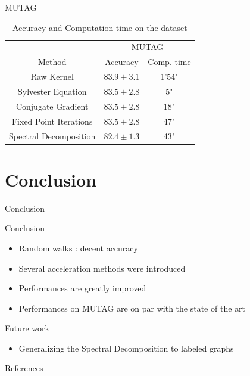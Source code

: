 \documentclass[compress]{beamer}
\begin{document}
\begin{frame}{MUTAG}
\begin{table}[!htb]
	\begin{center}
		\begin{tabular}{|c||c|c|}
			\hline
			& \multicolumn{2}{|c|}{MUTAG}\\
			\cline{2-3}
			Method & Accuracy & Comp. time\\
			\hline 
			Raw Kernel & $83.9\pm 3.1$ & 1'54"\\
			Sylvester Equation & $83.5\pm 2.8$ & 5"\\
			Conjugate Gradient & $83.5\pm 2.8$ & 18"\\
			Fixed Point Iterations & $83.5\pm 2.8$ & 47" \\
			Spectral Decomposition & $82.4\pm 1.3$ & 43"\\
			\hline
		\end{tabular}
	\end{center}
	\caption*{Accuracy and Computation time on the dataset}
\end{table}
\end{frame}


\section{Conclusion}
\begin{frame}{Conclusion}
\begin{block}{Conclusion}
	\begin{itemize}
		\item Random walks : decent accuracy
		\item Several acceleration methods were introduced
		\item Performances are greatly improved
		\item Performances on MUTAG are on par with the state of the art
	\end{itemize}
\end{block}
\begin{block}{Future work}
	\begin{itemize}
		\item Generalizing the Spectral Decomposition to labeled graphs
	\end{itemize}
\end{block}
\end{frame}

\renewcommand\bibsection{\subsection{\refname}}
\begin{frame}{References}
\nocite{bondy1976graph,borgwardt_protein_2005,imrich2000product,burges_tutorial_1998,vapnik_statistical_1998,nesterov_lectures_2018,shervashidze_efficient_2009}
\footnotesize

\end{frame}
\end{document}

